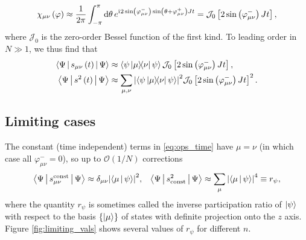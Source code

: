 \documentclass[nofootinbib,notitlepage,11pt]{revtex4-2}
\renewcommand{\t}{\text} %
\newcommand{\f}[2]{\dfrac{#1}{#2}} %
\newcommand{\p}[1]{\left(#1\right)} %
\renewcommand{\sp}[1]{\left[#1\right]} %
\renewcommand{\set}[1]{\left\{#1\right\}} %
\newcommand{\bk}{\Braket} %
\renewcommand{\dd}{\text{d}} %
\renewcommand{\i}{\mathrm{i}\mkern1mu} %
\newcommand{\1}{\mathds{1}}
\newcommand{\J}{\mathcal{J}}
\renewcommand{\O}{\mathcal{O}}
\begin{document}
\begin{align}
  \chi_{\mu\nu}\p{\varphi} \approx \f1{2\pi} \int_{-\pi}^\pi \dd\theta\,
  e^{\i 2\sin\p{\varphi_{\mu\nu}^-} \sin\p{\theta+\varphi_{\mu\nu}^+} J t}
  = \J_0\sp{2 \sin\p{\varphi_{\mu\nu}^-} J t},
\end{align}
where $\J_0$ is the zero-order Bessel function of the first kind.
To leading order in $N\gg1$, we thus find that
\begin{align}
  \bk{\Psi|s_{\mu\nu}\p{t}|\Psi}
  &\approx \bk{\psi\op{\mu}{\nu}\psi}
  \J_0\sp{2\sin\p{\varphi_{\mu\nu}^-}Jt},
  \\
  \bk{\Psi|s^2\p{t}|\Psi}
  &\approx \sum_{\mu,\nu} \abs{\bk{\psi\op{\mu}{\nu}\psi}}^2
  \J_0\sp{2\sin\p{\varphi_{\mu\nu}^-}Jt}^2.
  \label{eq:ops_time}
\end{align}

\subsection{Limiting cases}

The constant (time independent) terms in \eqref{eq:ops_time} have $\mu=\nu$ (in which case all $\varphi_{\mu\nu}^-=0$), so up to $\O(1/N)$ corrections
\begin{align}
  \bk{\Psi|s_{\mu\nu}^{\t{const}}|\Psi}
  \approx \delta_{\mu\nu} \abs{\bk{\mu|\psi}}^2,
  &&
  \bk{\Psi|s^2_{\t{const}}|\Psi}
  \approx \sum_\mu \abs{\bk{\mu|\psi}}^4 \equiv r_\psi,
  \label{eq:ops_const}
\end{align}
where the quantity $r_\psi$ is sometimes called the inverse participation ratio of $\ket\psi$ with respect to the basis $\set{\ket\mu}$ of states with definite projection onto the $z$ axis.
Figure \ref{fig:limiting_vals} shows several values of $r_\psi$ for different $n$.
\end{document}
